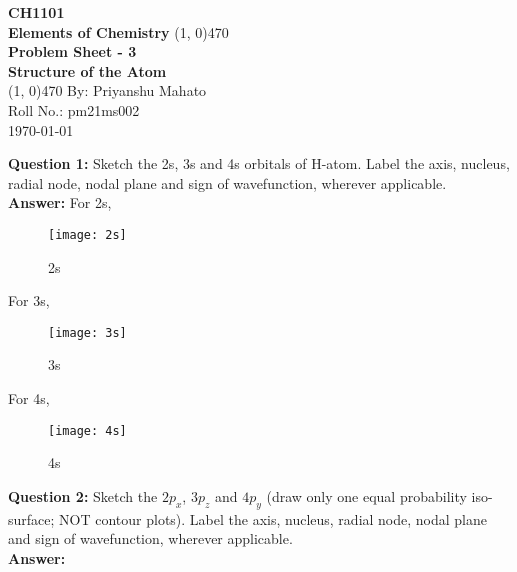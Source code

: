\documentclass[12pt]{article}
\begin{document}
	\thispagestyle{empty}
	
	\begin{titlepage}
		\begin{center}
			\vspace{2cm}
			\huge\textbf{CH1101}\\
			\vspace{1cm}
			\large\textbf{Elements of Chemistry}
			\vfill
			\line(1, 0){470}\\[14pt]
			\huge\textbf{Problem Sheet - 3}\\[10pt]
			\Large\textbf{Structure of the Atom}\\[14pt]
			\line(1, 0){470}
			\vfill
			By: Priyanshu Mahato\\
			Roll No.: pm21ms002\\
			\today
		\end{center}
	\end{titlepage}

	\setcounter{page}{1}
	
	\textbf{Question 1: }Sketch the 2s, 3s and 4s orbitals of H-atom. Label the axis, nucleus, radial node, nodal plane and sign of wavefunction, wherever applicable.\\
	
	\textbf{Answer: } For 2s,\\
	
	\begin{figure}[H]
		\centering
		\texttt{[image: 2s]}
		\caption{2s}
	\end{figure}

	For 3s,\\

	\begin{figure}[H]
		\centering
		\texttt{[image: 3s]}
		\caption{3s}
	\end{figure}

	For 4s,\\
	
	\begin{figure}[H]
		\centering
		\texttt{[image: 4s]}
		\caption{4s}
	\end{figure}

	\textbf{Question 2: }Sketch the $2p_{x}$, $3p_{z}$ and $4p_{y}$ (draw only one equal probability iso-surface; NOT contour plots). Label the axis, nucleus, radial node, nodal plane and sign of wavefunction, wherever applicable.\\
	
	\textbf{Answer: }
\end{document}
